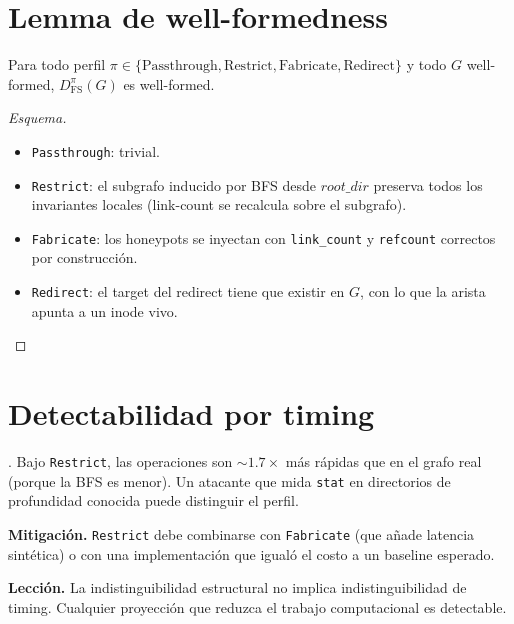 \section{Lemma de well-formedness}

\begin{lema}
\label{lem:dfs-wellformed}
Para todo perfil $\pi \in \{\mathrm{Passthrough}, \mathrm{Restrict},
\mathrm{Fabricate}, \mathrm{Redirect}\}$ y todo $G$ well-formed,
$D_{\mathrm{FS}}^{\pi}(G)$ es well-formed.
\end{lema}

\begin{proof}[Esquema]
\begin{itemize}
  \item \texttt{Passthrough}: trivial.
  \item \texttt{Restrict}: el subgrafo inducido por BFS desde
    $\mathit{root\_dir}$ preserva todos los invariantes locales
    (link-count se recalcula sobre el subgrafo).
  \item \texttt{Fabricate}: los honeypots se inyectan con
    \texttt{link\_count} y \texttt{refcount} correctos por
    construcción.
  \item \texttt{Redirect}: el target del redirect tiene que existir
    en $G$, con lo que la arista \econtains{} apunta a un inode vivo.
\end{itemize}
\end{proof}

\section{Detectabilidad por timing}

\begin{trampa}
\label{tr:restrict-timing}
. Bajo
\texttt{Restrict}, las operaciones son ${\sim}1.7\times$ más rápidas
que en el grafo real (porque la BFS es menor). Un atacante que mida
\texttt{stat} en directorios de profundidad conocida puede
distinguir el perfil.

\textbf{Mitigación.} \texttt{Restrict} debe combinarse con
\texttt{Fabricate} (que añade latencia sintética) o con una
implementación que igualó el costo a un baseline esperado.

\textbf{Lección.} La indistinguibilidad estructural no implica
indistinguibilidad de timing. Cualquier proyección que reduzca el
trabajo computacional es detectable.
\end{trampa}

